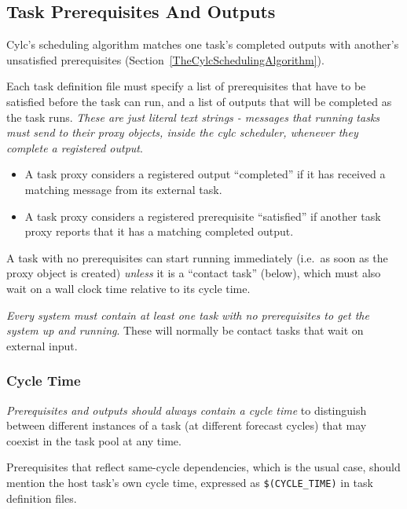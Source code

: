 \documentclass[11pt,a4paper]{article}
\begin{document}
\subsection{Task Prerequisites And Outputs}
\label{TaskPrerequisitesAndOutputs}

Cylc's scheduling algorithm matches one task's completed outputs with
another's unsatisfied prerequisites
(Section~\ref{TheCylcSchedulingAlgorithm}).  

Each task definition file must specify a list of prerequisites that have
to be satisfied before the task can run, and a list of outputs that will
be completed as the task runs. {\em These are just literal text
strings - messages that running tasks must send to their proxy objects,
inside the cylc scheduler, whenever they complete a registered output}.

\begin{itemize}
    \item A task proxy considers a registered output ``completed''
        if it has received a matching message from its external task.

    \item A task proxy considers a registered prerequisite ``satisfied''
        if another task proxy reports that it has a matching completed
        output.

\end{itemize}

A task with no prerequisites can start running immediately (i.e.\ as soon
as the proxy object is created) {\em unless} it is a ``contact task''
(below), which must also wait on a wall clock time relative to its cycle time.

{\em Every system must contain at least one task with no prerequisites
to get the system up and running}. These will normally be contact tasks that wait
on external input.


\lstset{language=cylctaskdef} 

\subsubsection{Cycle Time}

{\em Prerequisites and outputs should always contain a cycle time} to
distinguish between different instances of a task (at different 
forecast cycles) that may coexist in the task pool at any time. 

Prerequisites that reflect same-cycle dependencies, which is the usual
case, should mention the host task's own cycle time, expressed as
\lstinline=$(CYCLE_TIME)= in task definition files.
\end{document}
